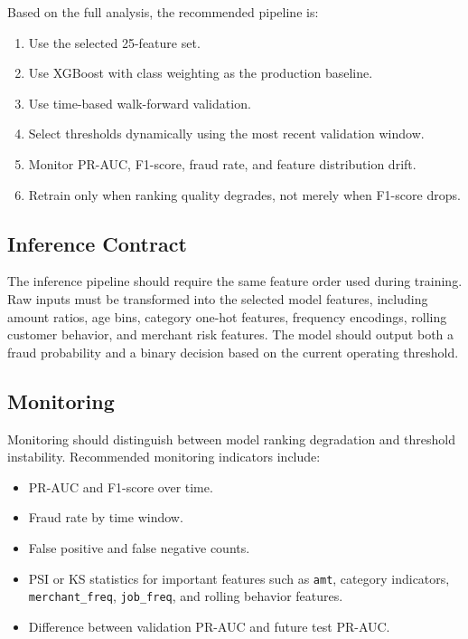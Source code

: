 \documentclass[12pt,a4paper,twoside]{article}
\begin{document}
Based on the full analysis, the recommended pipeline is:
\begin{enumerate}
    \item Use the selected 25-feature set.
    \item Use XGBoost with class weighting as the production baseline.
    \item Use time-based walk-forward validation.
    \item Select thresholds dynamically using the most recent validation window.
    \item Monitor PR-AUC, F1-score, fraud rate, and feature distribution drift.
    \item Retrain only when ranking quality degrades, not merely when F1-score drops.
\end{enumerate}

\subsection{Inference Contract}

The inference pipeline should require the same feature order used during training. Raw inputs must be transformed into the selected model features, including amount ratios, age bins, category one-hot features, frequency encodings, rolling customer behavior, and merchant risk features. The model should output both a fraud probability and a binary decision based on the current operating threshold.

\subsection{Monitoring}

Monitoring should distinguish between model ranking degradation and threshold instability. Recommended monitoring indicators include:
\begin{itemize}
    \item PR-AUC and F1-score over time.
    \item Fraud rate by time window.
    \item False positive and false negative counts.
    \item PSI or KS statistics for important features such as \texttt{amt}, category indicators, \texttt{merchant\_freq}, \texttt{job\_freq}, and rolling behavior features.
    \item Difference between validation PR-AUC and future test PR-AUC.
\end{itemize}
\end{document}
